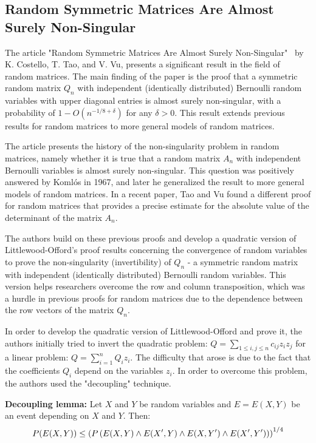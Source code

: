 
\subsection{Random Symmetric Matrices Are Almost Surely Non-Singular}



The article "Random Symmetric Matrices Are Almost Surely Non-Singular"~\cite{costello2005random} by K. Costello, T. Tao, and V. Vu, presents a significant result in the field of random matrices. The main finding of the paper is the proof that a symmetric random matrix \( Q_n \) with independent (identically distributed) Bernoulli random variables with upper diagonal entries is almost surely non-singular, with a probability of  \( 1-O(n^{-1/8+\delta}) \) for any \( \delta>0 \). This result extends previous results for random matrices to more general models of random matrices.

The article presents the history of the non-singularity problem in random matrices, namely whether it is true that a random matrix \( A_n \) with independent Bernoulli variables is almost surely non-singular. This question was positively answered by Komlós in 1967, and later he generalized the result to more general models of random matrices. In a recent paper, Tao and Vu found a different proof for random matrices that provides a precise estimate for the absolute value of the determinant of the matrix \( A_n \).

The authors build on these previous proofs and develop a quadratic version of Littlewood-Offord's proof results concerning the convergence of random variables to prove the non-singularity (invertibility) of \( Q_n \) - a symmetric random matrix with independent (identically distributed) Bernoulli random variables. This version helps researchers overcome the row and column transposition, which was a hurdle in previous proofs for random matrices due to the dependence between the row vectors of the matrix \( Q_n \).

In order to develop the quadratic version of Littlewood-Offord and prove it, the authors initially tried to invert the quadratic problem: \( Q=\sum_{1\leq i,j\leq n} c_{ij} z_i z_j \) for a linear problem: \( Q=\sum_{i=1}^n Q_i z_i \). The difficulty that arose is due to the fact that the coefficients \( Q_i \) depend on the variables \( z_i \). In order to overcome this problem, the authors used the "decoupling" technique.
\vspace{\baselineskip}

\textbf{Decoupling lemma:} Let \( X \) and \( Y \) be random variables and \( E=E(X,Y) \) be an event depending on \( X \) and \( Y \). Then:
\vspace{-0.6\baselineskip}
\[ P(E(X,Y)) \leq \left( P\left( E(X,Y) \land E(X',Y) \land E(X,Y') \land E(X',Y') \right) \right)^{1/4} \vspace{-0.5\baselineskip} \]

